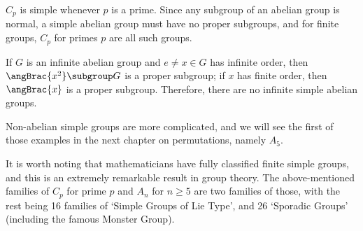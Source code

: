 \begin{example*}
    \(C_p\) is simple whenever \(p\) is a prime. Since any subgroup of an abelian group is normal, a simple abelian group must have no proper subgroups, and for finite groups, \(C_p\) for primes \(p\) are all such groups.

    If \(G\) is an infinite abelian group and \(e \neq x \in G\) has infinite order, then \(\angBrac{x^2} \subgroup G\) is a proper subgroup; if \(x\) has finite order, then \(\angBrac{x}\) is a proper subgroup. Therefore, there are no infinite simple abelian groups. 
\end{example*}

Non-abelian simple groups are more complicated, and we will see the first of those examples in the next chapter on permutations, namely \(A_5\).

It is worth noting that mathematicians have fully classified finite simple groups, and this is an extremely remarkable result in group theory. The above-mentioned families of \(C_p\) for prime \(p\) and \(A_n\) for \(n \geq 5\) are two families of those, with the rest being 16 families of `Simple Groups of Lie Type', and 26 `Sporadic Groups' (including the famous Monster Group).